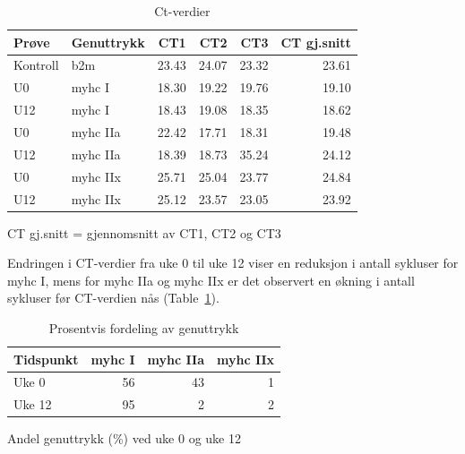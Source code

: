 \documentclass[
  letterpaper,
  DIV=11,
  numbers=noendperiod]{scrreprt}
\begin{document}
\begin{longtable}{llrrrr}

\caption{\label{tbl-ctvals}Ct-verdier}

\tabularnewline

\toprule
Prøve & Genuttrykk & CT1 & CT2 & CT3 & CT gj.snitt \\ 
\midrule\addlinespace[2.5pt]
Kontroll & b2m & 23.43 & 24.07 & 23.32 & 23.61 \\ 
U0 & myhc I & 18.30 & 19.22 & 19.76 & 19.10 \\ 
U12 & myhc I & 18.43 & 19.08 & 18.35 & 18.62 \\ 
U0 & myhc IIa & 22.42 & 17.71 & 18.31 & 19.48 \\ 
U12 & myhc IIa & 18.39 & 18.73 & 35.24 & 24.12 \\ 
U0 & myhc IIx & 25.71 & 25.04 & 23.77 & 24.84 \\ 
U12 & myhc IIx & 25.12 & 23.57 & 23.05 & 23.92 \\ 
\bottomrule

\end{longtable}

\begin{minipage}{\linewidth}
CT gj.snitt = gjennomsnitt av CT1, CT2 og CT3\\
\end{minipage}
\endgroup

Endringen i CT-verdier fra uke 0 til uke 12 viser en reduksjon i antall
sykluser for myhc I, mens for myhc IIa og myhc IIx er det observert en
økning i antall sykluser før CT-verdien nås (Table~\ref{tbl-ctvals}).

\begingroup
\fontsize{12.0pt}{14.4pt}\selectfont
\setlength{\LTpost}{0mm}

\begin{longtable}{lrrr}

\caption{\label{tbl-genes}Prosentvis fordeling av genuttrykk}

\tabularnewline

\toprule
Tidspunkt & myhc I & myhc IIa & myhc IIx \\ 
\midrule\addlinespace[2.5pt]
Uke 0 & 56 & 43 & 1 \\ 
Uke 12 & 95 & 2 & 2 \\ 
\bottomrule

\end{longtable}

\begin{minipage}{\linewidth}
Andel genuttrykk (\%) ved uke 0 og uke 12\\
\end{minipage}
\endgroup
\end{document}
